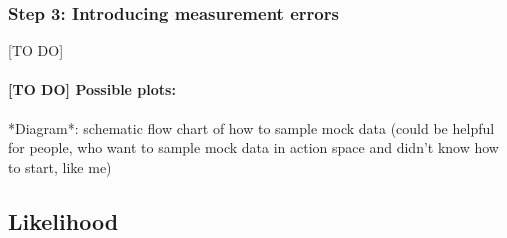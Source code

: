 \documentclass[12pt,preprint]{aastex}
\begin{document}
%



\subsubsection{Step 3: Introducing measurement errors}

[TO DO]

\paragraph{[TO DO] Possible plots:} *Diagram*: schematic flow chart of how to sample mock data (could be helpful for people, who want to sample mock data in action space and didn't know how to start, like me)


\subsection{Likelihood}
\end{document}
